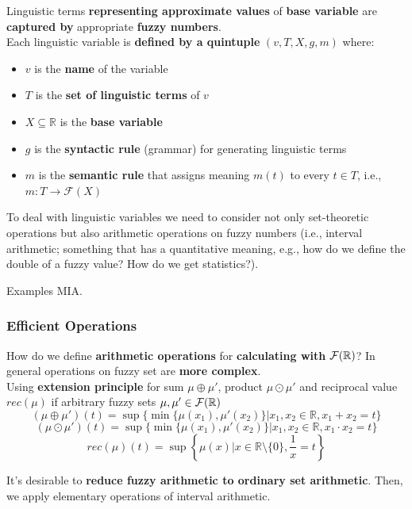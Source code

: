 Linguistic terms \textbf{representing approximate values} of \textbf{base variable} are \textbf{captured by} appropriate \textbf{fuzzy numbers}.\\

Each linguistic variable is \textbf{defined by a quintuple} $(v, T, X, g, m)$ where:
\begin{itemize}
	\item $v$ is the \textbf{name} of the variable
	\item $T$ is the \textbf{set of linguistic terms} of $v$
	\item $X \subseteq \mathbb{R}$ is the \textbf{base variable}
	\item $g$ is the \textbf{syntactic rule} (grammar) for generating linguistic terms
	\item $m$ is the \textbf{semantic rule} that assigns meaning $m(t)$ to every $t \in T$, i.e., $m: T \rightarrow \mathcal{F} (X)$
\end{itemize}

To deal with linguistic variables we need to consider not only set-theoretic operations but also arithmetic operations on fuzzy numbers (i.e., interval arithmetic; something that has a quantitative meaning, e.g., how do we define the double of a fuzzy value? How do we get statistics?).\\

\vfill 

Examples MIA. \\

\newpage

\subsubsection{Efficient Operations}
How do we define \textbf{arithmetic operations} for \textbf{calculating with} $\mathcal{F} (\mathbb{R})$? In general operations on fuzzy set are \textbf{more complex}.\\

Using \textbf{extension principle} for sum $\mu \oplus \mu'$, product $\mu \odot \mu'$ and reciprocal value $rec(\mu)$ if arbitrary fuzzy sets $\mu, \mu' \in \mathcal{F} (\mathbb{R})$
$$ (\mu \oplus \mu') (t) = \sup \{\min \{\mu(x_1), \mu'(x_2)\} | x_1, x_2 \in \mathbb{R}, x_1 + x_2 = t\}$$
$$ (\mu \odot \mu') (t) = \sup \{\min \{\mu(x_1), \mu'(x_2)\} | x_1, x_2 \in \mathbb{R}, x_1 \cdot x_2 = t\}$$
$$ rec (\mu) (t) = \sup \left\{\mu(x) | x \in \mathbb{R} \setminus \{0\}, \frac{1}{x} = t \right\} $$

It's desirable to \textbf{reduce fuzzy arithmetic to ordinary set arithmetic}. Then, we apply elementary operations of interval arithmetic.\\

